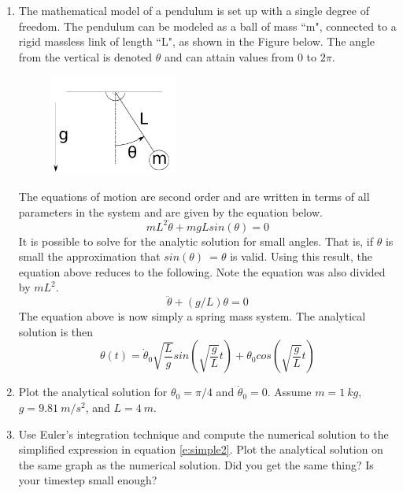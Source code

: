 \begin{enumerate}
\item The mathematical model of a pendulum is set up with a single degree of
freedom. The pendulum can be modeled as a ball of mass ``m", connected
to a rigid massless link of length ``L", as shown in the Figure below. The angle from
the vertical is denoted $\theta$ and can attain values from 0 to
$2\pi$. 
\begin{figure}[htb]
  \begin{center}
    \includegraphics[width=0.4\textwidth]{Graphics/Pendulum.pdf}
  \end{center}
\end{figure}
The equations of motion are second order and are written in terms of
all parameters in the system and are given by the equation below.
\begin{equation}\label{e:full2}
mL^2\ddot{\theta} + mgLsin(\theta) = 0
\end{equation}
It is possible to solve for the analytic solution for small
angles. That is, if $\theta$ is small the approximation
that $sin(\theta) ~= \theta$ is valid. Using this result, the equation above
reduces to the following. Note the equation was also divided by $mL^2$.
\begin{equation}\label{e:simple2}
  \ddot{\theta} + (g/L)\theta = 0
\end{equation}
\noindent The equation above is now simply a spring mass system. The analytical
solution is then
\begin{equation}
\theta(t) = \dot{\theta}_0 \sqrt{\frac{L} g} sin(\sqrt{\frac{g} L}t) + \theta_0 cos(\sqrt{\frac{g} L}t)
\end{equation}

\item Plot the analytical solution for $\theta_0 = \pi/4$ and
$\dot{\theta}_0 = 0$. Assume $m=1~kg$, $g=9.81~m/s^2$, and $L=4~m$.
\ \\

\item Use Euler's integration technique and compute the
numerical solution to the simplified expression in equation
\ref{e:simple2}. Plot the analytical solution on the same graph as the
numerical solution. Did you get the same thing? Is your timestep small enough?
\ \\


\end{enumerate}
